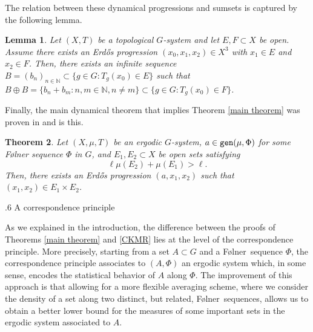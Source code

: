 \documentclass[reqno]{amsart}
\makeatletter
\def\N{{\mathbb N}}
\newtheorem{theorem}{Theorem}[section]
\newtheorem{lemma}[theorem]{Lemma}
\theoremstyle{definition}
\theoremstyle{remark}
\def\subsection{\@startsection{subsection}{2}%
  \z@{.4\linespacing\@plus.7\linespacing}
{.6\baselineskip}%
  {\normalfont\centering\bfseries}%
}
\theoremstyle{remark}
\def\N{{\mathbb N}}
\newcommand{\gen}{\texttt{\textup{gen}}}
\newcommand{\Erdos}{Erd\H{o}s}
\newcommand{\Folner}{F\o{}lner}
\makeatother
\begin{document}
The relation between these dynamical progressions and sumsets 
is captured by the following lemma. 

\begin{lemma}\cite[Lemma $3.4$]{Charamaras_Mountakis_2025} \label{EP and B+B} 
Let $(X,T)$ be a topological $G$-system and let $E,F\subset X$ be open. Assume 
there exists an Erd\H{o}s progression $(x_0,x_1,x_2) \in X^3$ with $x_1\in E$ 
and $x_2\in F$. Then, there exists an infinite sequence $B=(b_n)_{n\in \N} 
\subset \{g\in G: T_g(x_0) \in E\}$ such that $B \oplus B =
\{b_n + b_m \colon n,m \in \N, n \neq m\} \subset \{g\in G: 
T_g(x_0)\in F\}$.
\end{lemma}

Finally, the main dynamical theorem that implies Theorem 
\ref{main theorem} was proven in \cite{charamaras_kousek_mountakis_radic2025BBingroups} and is this. 

\begin{theorem}{{\cite[Theorem 2.5]{charamaras_kousek_mountakis_radic2025BBingroups}}} \label{analogue of 2.1 KR}
Let $(X,\mu,T)$ be an ergodic $G$-system, $a\in \gen(\mu,\Phi)$ for some \Folner{} sequence $\Phi$ in $G$,  
and $E_1,E_2 \subset X$ be open sets satisfying
\begin{equation}\label{1_1}
\ell \mu(E_2)+\mu(E_1) > \ell.
\end{equation}
Then, there exists an \Erdos{} progression $(a,x_1,x_2)$ such that $(x_1,x_2) \in E_1 \times E_2$.
\end{theorem}    


\subsection{A correspondence principle}
\label{section_dynamical_st}

As we explained in the introduction, the difference between 
the proofs of Theorems \ref{main theorem} and \ref{CKMR} lies 
at the level of the correspondence principle. More precisely, 
starting from a set $A\subset G$ and a \Folner\ sequence 
$\Phi$, the correspondence principle associates to $(A,\Phi)$ 
an ergodic system which, in some sense, encodes the 
statistical behavior of $A$ along $\Phi$. The improvement of 
this approach is that allowing for a more flexible averaging 
scheme, where we 
consider the density of a set along two distinct, but 
related, \Folner\ sequences, allows us to obtain a better 
lower bound for the measures of some important sets 
in the ergodic system associated to $A$. 
\end{document}

